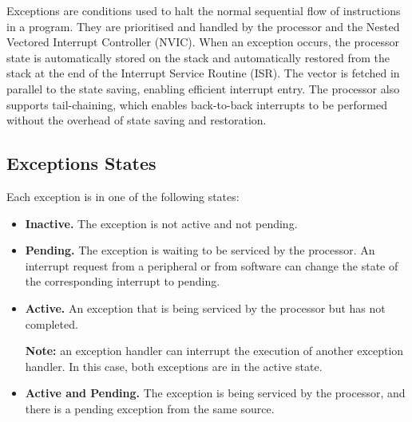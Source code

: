 \documentclass{article}
\begin{document}
Exceptions are conditions used to halt the normal sequential flow of
instructions in a program. They are prioritised and handled by the
processor and the Nested Vectored Interrupt Controller (NVIC). When an
exception occurs, the processor state is automatically stored on the
stack and automatically restored from the stack at the end of the
Interrupt Service Routine (ISR). The vector is fetched in parallel to
the state saving, enabling efficient interrupt entry. The processor
also supports tail-chaining, which enables back-to-back interrupts to
be performed without the overhead of state saving and restoration.
\subsection{Exceptions States}
Each exception is in one of the following states:
\begin{itemize}
    \item \textbf{Inactive.} The exception is not active and not pending.
    \item \textbf{Pending.} The exception is waiting to be serviced by
          the processor. An interrupt request from a peripheral or from
          software can change the state of the corresponding interrupt
          to pending.
    \item \textbf{Active.} An exception that is being serviced by the
          processor but has not completed.

          \textbf{Note:} an exception handler can interrupt the
          execution of another exception handler. In this case, both
          exceptions are in the active state.
    \item \textbf{Active and Pending.} The exception is being serviced
          by the processor, and there is a pending exception from the
          same source.
\end{itemize}
\end{document}
